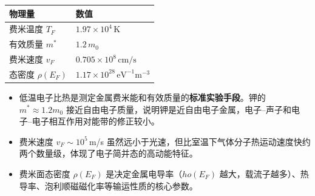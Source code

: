 \begin{formulabox}[答案汇总]
\begin{center}
\begin{tabular}{ll}
\toprule
\textbf{物理量} & \textbf{数值} \\
\midrule
费米温度 $T_F$ & $1.97\times10^4\,\text{K}$ \\
有效质量 $m^*$ & $1.2\,m_0$ \\
费米速度 $v_F$ & $0.705\times10^8\,\text{cm/s}$ \\
态密度 $\rho(E_F)$ & $1.17\times10^{28}\,\text{eV}^{-1}\text{m}^{-3}$ \\
\bottomrule
\end{tabular}
\end{center}
\end{formulabox}

\begin{insightbox}[物理图像]
\begin{itemize}
    \item 低温电子比热是测定金属费米能和有效质量的\textbf{标准实验手段}。钾的 $m^*\approx1.2m_0$ 接近自由电子质量，说明钾是近自由电子金属，电子--声子和电子--电子相互作用对能带的修正较小。
    \item 费米速度 $v_F\sim10^5\,$m/s 虽然远小于光速，但比室温下气体分子热运动速度快约两个数量级，体现了电子简并态的高动能特征。
    \item 费米面态密度 $\rho(E_F)$ 是决定金属电导率（$
ho(E_F)$ 越大，载流子越多）、热导率、泡利顺磁磁化率等输运性质的核心参数。
\end{itemize}
\end{insightbox}
